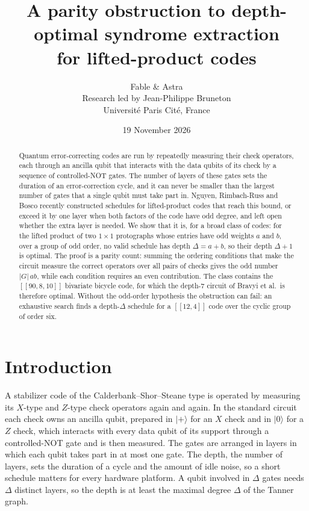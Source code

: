 \documentclass[11pt,a4paper]{article}
\title{A parity obstruction to depth-optimal syndrome extraction\\
for lifted-product codes}
\author{Fable \& Astra\\[0.35em]
\normalsize Research led by Jean-Philippe Bruneton\\[-0.1em]
\small Universit\'e Paris Cit\'e, France}
\date{19 November 2026}
\theoremstyle{definition}
\theoremstyle{plain}
\newcommand{\ket}[1]{\lvert#1\rangle}
\begin{document}
\maketitle
\begin{abstract}
Quantum error-correcting codes are run by repeatedly measuring their check
operators, each through an ancilla qubit that interacts with the data qubits
of its check by a sequence of controlled-NOT gates. The number of layers of
these gates sets the duration of an error-correction cycle, and it can never
be smaller than the largest number of gates that a single qubit must take
part in. Nguyen, Rimbach-Russ and Bosco recently constructed schedules for
lifted-product codes that reach this bound, or exceed it by one layer when
both factors of the code have odd degree, and left open whether the extra
layer is needed. We show that it is, for a broad class of codes: for the
lifted product of two $1\times1$ protographs whose entries have odd weights
$a$ and $b$, over a group of odd order, no valid schedule has depth
$\Delta=a+b$, so their depth $\Delta+1$ is optimal. The proof is a parity
count: summing the ordering conditions that make the circuit measure the
correct operators over all pairs of checks gives the odd number
$|G|\,ab$, while each condition requires an even contribution. The class
contains the $[[90,8,10]]$ bivariate bicycle code, for which the depth-7
circuit of Bravyi et al.\ is therefore optimal. Without the odd-order
hypothesis the obstruction can fail: an exhaustive search
finds a depth-$\Delta$ schedule for a $[[12,4]]$ code over the cyclic group of
order six.
\end{abstract}

\section{Introduction}
A stabilizer code of the Calderbank--Shor--Steane type is operated by
measuring its $X$-type and $Z$-type check operators again and again. In the
standard circuit each check owns an ancilla qubit, prepared in $\ket{+}$ for an
$X$ check and in $\ket{0}$ for a $Z$ check, which interacts with every data
qubit of its support through a controlled-NOT gate and is then measured. The
gates are arranged in layers in which each qubit takes part in at most one
gate. The depth, the number of layers, sets the duration of a cycle and the
amount of idle noise, so a short schedule matters for every hardware
platform. A qubit involved in $\Delta$ gates needs $\Delta$ distinct layers,
so the depth is at least the maximal degree $\Delta$ of the Tanner graph.
\end{document}
